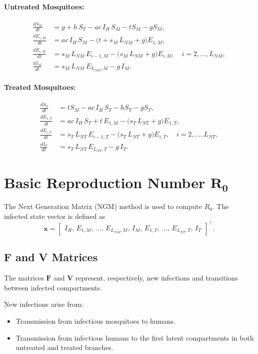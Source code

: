 \documentclass[12pt]{article}
\begin{document}
\paragraph{Untreated Mosquitoes:}
\begin{align*}
\frac{dS_M}{dt} &= g + h\,S_T - ac\,I_H\,S_M - tS_M - gS_M, \\
\frac{dE_{1,M}}{dt} &= ac\,I_H\,S_M - \Big(t + s_M \,L_{NM} + g\Big)E_{1,M}, \\
\frac{dE_{i,M}}{dt} &= s_M \,L_{NM}\,E_{i-1,M} - \Big(s_M\,L_{NM} + g\Big)E_{i,M}, \quad i=2,\dots,L_{NM}, \\
\frac{dI_M}{dt} &= s_M \,L_{NM}\,E_{L_{NM},M} - g\,I_M.
\end{align*}

\paragraph{Treated Mosquitoes:}
\begin{align*}
\frac{dS_T}{dt} &= tS_M - ac\,I_H\,S_T - hS_T - gS_T, \\
\frac{dE_{1,T}}{dt} &= ac\,I_H\,S_T + t\,E_{1,M} - \Big(s_T\,L_{NT} + g\Big)E_{1,T}, \\
\frac{dE_{i,T}}{dt} &= s_T\,L_{NT}\,E_{i-1,T} - \Big(s_T\,L_{NT} + g\Big)E_{i,T}, \quad i=2,\dots,L_{NT}, \\
\frac{dI_T}{dt} &= s_T\,L_{NT}\,E_{L_{NT},T} - g\,I_T.
\end{align*}

\section{Basic Reproduction Number \(\mathbf{R_0}\)}

The Next Generation Matrix (NGM) method is used to compute \(R_0\). The infected state vector is defined as
\[
\mathbf{x} = \begin{bmatrix}
I_H,\, E_{1,M},\, \dots,\, E_{L_{NM},M},\, I_M,\, E_{1,T},\, \dots,\, E_{L_{NT},T},\, I_T
\end{bmatrix}^\top.
\]

\subsection{F and V Matrices}

The matrices \(\mathbf{F}\) and \(\mathbf{V}\) represent, respectively, new infections and transitions between infected compartments.

New infections arise from:
\begin{itemize}
    \item Transmission from infectious mosquitoes to humans.
    \item Transmission from infectious humans to the first latent compartments in both untreated and treated branches.
\end{itemize}
\end{document}
